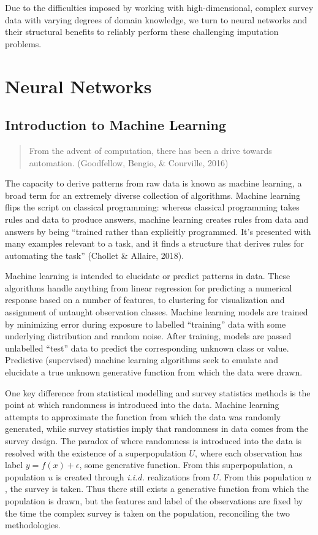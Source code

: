 \documentclass[12pt,twoside]{reedthesis}
\begin{document}
Due to the difficulties imposed by working with high-dimensional,
complex survey data with varying degrees of domain knowledge, we turn to
neural networks and their structural benefits to reliably perform these
challenging imputation problems.

\chapter{Neural Networks}\label{math-sci}

\section{Introduction to Machine
Learning}\label{introduction-to-machine-learning}
\begin{quote}
From the advent of computation, there has been a drive towards
automation. (Goodfellow, Bengio, \& Courville, 2016)
\end{quote}
The capacity to derive patterns from raw data is known as machine
learning, a broad term for an extremely diverse collection of
algorithms. Machine learning flips the script on classical programming:
whereas classical programming takes rules and data to produce answers,
machine learning creates rules from data and answers by being ``trained
rather than explicitly programmed. It's presented with many examples
relevant to a task, and it finds a structure that derives rules for
automating the task'' (Chollet \& Allaire, 2018).

Machine learning is intended to elucidate or predict patterns in data.
These algorithms handle anything from linear regression for predicting a
numerical response based on a number of features, to clustering for
visualization and assignment of untaught observation classes. Machine
learning models are trained by minimizing error during exposure to
labelled ``training'' data with some underlying distribution and random
noise. After training, models are passed unlabelled ``test'' data to
predict the corresponding unknown class or value. Predictive
(supervised) machine learning algorithms seek to emulate and elucidate a
true unknown generative function from which the data were drawn.

One key difference from statistical modelling and survey statistics
methods is the point at which randomness is introduced into the data.
Machine learning attempts to approximate the function from which the
data was randomly generated, while survey statistics imply that
randomness in data comes from the survey design. The paradox of where
randomness is introduced into the data is resolved with the existence of
a superpopulation \(U\), where each observation has label
\(y = f(x) + \epsilon\), some generative function. From this
superpopulation, a population \(u\) is created through \emph{i.i.d.}
realizations from \(U\). From this population \(u\), the survey is
taken. Thus there still exists a generative function from which the
population is drawn, but the features and label of the observations are
fixed by the time the complex survey is taken on the population,
reconciling the two methodologies.
\end{document}
